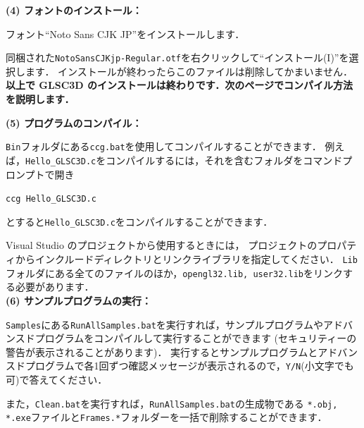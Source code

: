 \documentclass[platex,a4paper,12pt]{jsarticle}%
\begin{document}
\noindent \textbf{(4) フォントのインストール：} 

フォント``Noto Sans CJK JP''をインストールします．

同梱された\verb|NotoSansCJKjp-Regular.otf|を右クリックして``インストール(I)''を選択します．
インストールが終わったらこのファイルは削除してかまいません．\\

\textbf{以上で GLSC3D のインストールは終わりです．次のページでコンパイル方法を説明します．}

\newpage
\noindent \textbf{(5) プログラムのコンパイル：} 

\verb|Bin|フォルダにある\verb|ccg.bat|を使用してコンパイルすることができます．
例えば，\verb|Hello_GLSC3D.c|をコンパイルするには，それを含むフォルダをコマンドプロンプトで開き
\begin{center}
	\verb|ccg Hello_GLSC3D.c|
\end{center}
とすると\verb|Hello_GLSC3D.c|をコンパイルすることができます．

Visual Studio のプロジェクトから使用するときには，
プロジェクトのプロパティからインクルードディレクトリとリンクライブラリを指定してください．
\verb|Lib|フォルダにある全てのファイルのほか，\verb|opengl32.lib, user32.lib|をリンクする必要があります．\\

\noindent \textbf{(6) サンプルプログラムの実行：} 

\verb|Samples|にある\verb|RunAllSamples.bat|を実行すれば，サンプルプログラムやアドバンスドプログラムをコンパイルして実行することができます
(セキュリティーの警告が表示されることがあります)．
実行するとサンプルプログラムとアドバンスドプログラムで各1回ずつ確認メッセージが表示されるので，\verb|Y/N|(小文字でも可)で答えてください．

また，\verb|Clean.bat|を実行すれば，\verb|RunAllSamples.bat|の生成物である
\verb|*.obj, *.exe|ファイルと\verb|Frames.*|フォルダーを一括で削除することができます．\\
\end{document}
